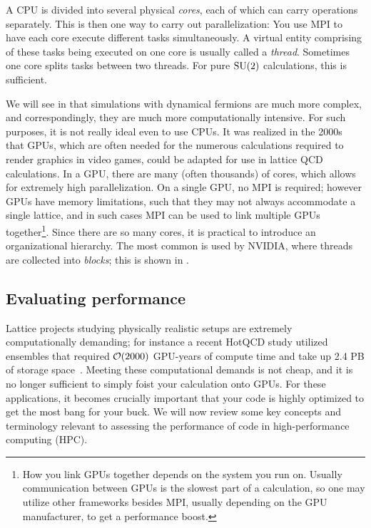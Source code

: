 A CPU is divided into several physical {\it cores}, each of which can
carry operations separately. This is then one way to carry out parallelization:
You use MPI to have each core execute different tasks simultaneously.
A virtual entity comprising of these tasks being executed on one core
is usually called a {\it thread}. Sometimes one core splits
tasks between two threads. For pure $\operatorname{SU}(2)$ calculations, this
is sufficient.

We will see in  that simulations with dynamical fermions
are much more complex, and correspondingly, they are much more
computationally intensive. For such purposes, it is not really ideal even
to use CPUs. It was realized in the 2000s~\cite{egri_lattice_2007}
that GPUs, which
are often needed for the numerous calculations required to render graphics
in video games, could be adapted for use in lattice QCD calculations.
In a GPU, there are many (often thousands) of cores, which allows for
extremely high parallelization. On a single GPU, no MPI is required;
however GPUs have memory limitations, such that they may not always accommodate
a single lattice, and in such cases MPI can be used to link
multiple GPUs together\footnote{How you link GPUs together depends on the
system you run on. Usually communication between GPUs is the slowest part
of a calculation, so one may utilize other frameworks besides MPI, usually
depending on the GPU manufacturer, to get a performance boost.}.
Since there are so many cores, it is practical to introduce an organizational
hierarchy. The most common is used by NVIDIA, where threads are collected
into {\it blocks}; this is shown in .

\subsection{Evaluating performance}

Lattice projects studying physically realistic setups
 are extremely computationally demanding; for instance
a recent HotQCD study utilized ensembles that required
$\order{2000}$ GPU-years of compute time and take up 2.4 PB of storage 
space~\cite{Bollweg:2021vqf}. Meeting these computational demands is
not cheap, and it is no longer sufficient to simply foist your
calculation onto GPUs. For these applications, it becomes crucially 
important that your code is highly
optimized to get the most bang for your buck.
We will now review some key concepts and terminology
relevant to assessing the performance of code
in high-performance computing (HPC). 

